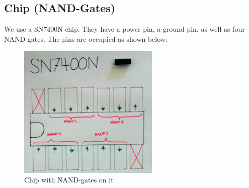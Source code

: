 \documentclass[10pt,a4paper]{article}
\begin{document}
\subsection{Chip (NAND-Gates)}
We use a SN7400N chip. They have a power pin, a ground pin, as well as four NAND-gates. The pins are occupied as shown below:
    \begin{figure}[H]
      \centering
      \includegraphics[width=0.6\textwidth]{sn7400n}%
      \caption{Chip with NAND-gates on it}%
      \label{fig:sn7400n}
    \end{figure}   
\end{document}
